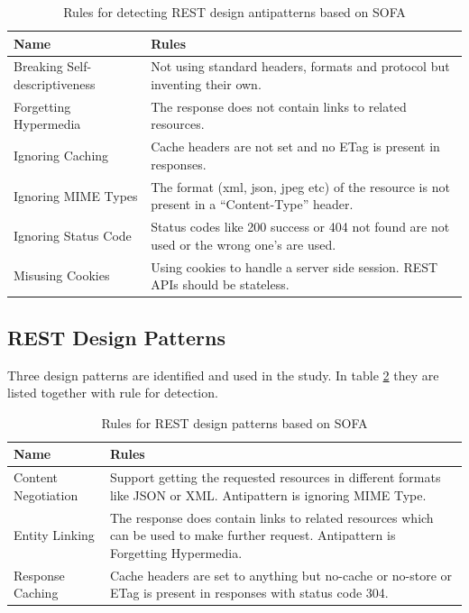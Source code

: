 \documentclass[a4paper,12pt]{article}
\begin{document}
\begin{center}
\begin{table}[!ht]
\begin{tabular}{|p{25mm}|p{110mm}|}
\hline \textbf{Name} & \textbf{Rules} \\
\hline 
Breaking Self-descriptiveness &
Not using standard headers, formats and protocol but inventing their own. 
\\ \hline
Forgetting Hypermedia &
The response does not contain links to related resources. 
\\ \hline
Ignoring Caching &
Cache headers are not set and no ETag is present in responses.
\\ \hline
Ignoring MIME Types &
The format (xml, json, jpeg etc) of the resource is not present in a “Content-Type” header.
\\ \hline
Ignoring Status Code &
Status codes like 200 success or 404 not found are not used or the wrong one’s are used.
\\ \hline
Misusing Cookies &
Using cookies to handle a server side session. REST APIs should be stateless. 
\\ \hline
\end{tabular}
    \caption{Rules for detecting REST design antipatterns based on SOFA \cite{sofaanti}}
    \label{tab:Rules for detecting REST design antipatterns}
\end{table}
\end{center}

\subsection{REST Design Patterns}

Three design patterns are identified and used in the study. In table \ref{tab:Rules for REST design patterns} they are listed together with rule for detection.

\begin{center}
\begin{table}[!ht]
\begin{tabular}{|p{25mm}|p{110mm}|}
\hline \textbf{Name} & \textbf{Rules} \\
\hline 
Content Negotiation &
Support getting the requested resources in different formats like JSON or XML. Antipattern is ignoring MIME Type.
\\ \hline
Entity Linking &
The response does contain links to related resources which can be used to make further request. Antipattern is Forgetting Hypermedia.
\\ \hline
Response Caching &
Cache headers are set to anything but no-cache or no-store or ETag is present in responses with status code 304.
\\ \hline
\end{tabular}
    \caption{Rules for REST design patterns based on SOFA \cite{sofapatt}}
    \label{tab:Rules for REST design patterns}
\end{table}
\end{center}
\clearpage
\end{document}
